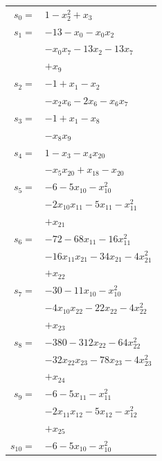 \begingroup
\small
\setlength{\tabcolsep}{2pt}
\setlength{\LTleft}{0pt}
\begin{longtable}{@{}r@{\;}l@{}}
\(s_{0}=\) & \(\displaystyle 1 -x_{2}^{2} +x_{3}\) \\[3pt]
\(s_{1}=\) & \(\displaystyle -13 -x_{0} -x_{0}x_{2}\) \\
 & \(\displaystyle -x_{0}x_{7} -13x_{2} -13x_{7}\) \\
 & \(\displaystyle +x_{9}\) \\[3pt]
\(s_{2}=\) & \(\displaystyle -1 +x_{1} -x_{2}\) \\
 & \(\displaystyle -x_{2}x_{6} -2x_{6} -x_{6}x_{7}\) \\[3pt]
\(s_{3}=\) & \(\displaystyle -1 +x_{1} -x_{8}\) \\
 & \(\displaystyle -x_{8}x_{9}\) \\[3pt]
\(s_{4}=\) & \(\displaystyle 1 -x_{3} -x_{4}x_{20}\) \\
 & \(\displaystyle -x_{5}x_{20} +x_{18} -x_{20}\) \\[3pt]
\(s_{5}=\) & \(\displaystyle -6 -5x_{10} -x_{10}^{2}\) \\
 & \(\displaystyle -2x_{10}x_{11} -5x_{11} -x_{11}^{2}\) \\
 & \(\displaystyle +x_{21}\) \\[3pt]
\(s_{6}=\) & \(\displaystyle -72 -68x_{11} -16x_{11}^{2}\) \\
 & \(\displaystyle -16x_{11}x_{21} -34x_{21} -4x_{21}^{2}\) \\
 & \(\displaystyle +x_{22}\) \\[3pt]
\(s_{7}=\) & \(\displaystyle -30 -11x_{10} -x_{10}^{2}\) \\
 & \(\displaystyle -4x_{10}x_{22} -22x_{22} -4x_{22}^{2}\) \\
 & \(\displaystyle +x_{23}\) \\[3pt]
\(s_{8}=\) & \(\displaystyle -380 -312x_{22} -64x_{22}^{2}\) \\
 & \(\displaystyle -32x_{22}x_{23} -78x_{23} -4x_{23}^{2}\) \\
 & \(\displaystyle +x_{24}\) \\[3pt]
\(s_{9}=\) & \(\displaystyle -6 -5x_{11} -x_{11}^{2}\) \\
 & \(\displaystyle -2x_{11}x_{12} -5x_{12} -x_{12}^{2}\) \\
 & \(\displaystyle +x_{25}\) \\[3pt]
\(s_{10}=\) & \(\displaystyle -6 -5x_{10} -x_{10}^{2}\) \\

\end{longtable}
